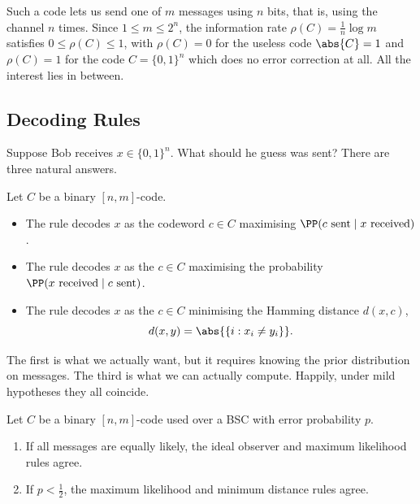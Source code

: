 Such a code lets us send one of $m$ messages using $n$ bits, that is, using the channel $n$ times. Since $1 \le m \le 2^n$, the information rate $\rho(C) = \frac1n \log m$ satisfies $0 \le \rho(C) \le 1$, with $\rho(C) = 0$ for the useless code $\abs{C} = 1$ and $\rho(C) = 1$ for the code $C = \{0,1\}^n$ which does no error correction at all. All the interest lies in between.

\subsection{Decoding Rules}

Suppose Bob receives $x \in \{0,1\}^n$. What should he guess was sent? There are three natural answers.

\begin{definition}
	Let $C$ be a binary $[n,m]$-code.
	\begin{itemize}
		\item The  rule decodes $x$ as the codeword $c \in C$ maximising $\PP(c \text{ sent} \mid x \text{ received})$.
		\item The  rule decodes $x$ as the $c \in C$ maximising the probability $\PP(x \text{ received} \mid c \text{ sent})$.
		\item The  rule decodes $x$ as the $c \in C$ minimising the Hamming distance $d(x,c)$,
		$$d(x,y) = \abs{\{i : x_i \ne y_i\}}.$$
	\end{itemize}
\end{definition}

The first is what we actually want, but it requires knowing the prior distribution on messages. The third is what we can actually compute. Happily, under mild hypotheses they all coincide.

\begin{lemma}\label{lem:decoding}
	Let $C$ be a binary $[n,m]$-code used over a BSC with error probability $p$.
	\begin{enumerate}[label=(\roman*)]
		\item If all messages are equally likely, the ideal observer and maximum likelihood rules agree.
		\item If $p < \tfrac12$, the maximum likelihood and minimum distance rules agree.
	\end{enumerate}
\end{lemma}


